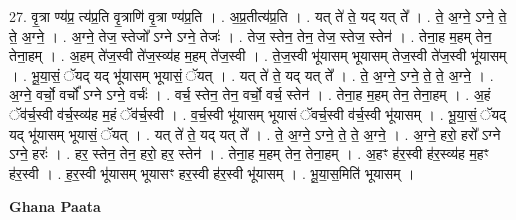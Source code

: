\documentclass[17pt]{extarticle}
\begin{document}
27. वृ॒त्रा ण्य॑प्र॒ त्य॑प्र॒ति वृ॒त्राणि॑ वृ॒त्रा ण्य॑प्र॒ति । . अ॒प्र॒तीत्य॑प्र॒ति । . यत् ते॑ ते॒ यद् यत् ते᳚ । . ते॒ अ॒ग्ने॒ ऽग्ने॒ ते॒ ते॒ अ॒ग्ने॒ । . अ॒ग्ने॒ तेज॒ स्तेजो᳚ ऽग्ने ऽग्ने॒ तेजः॑ । . तेज॒ स्तेन॒ तेन॒ तेज॒ स्तेज॒ स्तेन॑ । . तेना॒ह म॒हम् तेन॒ तेना॒हम् । . अ॒हम् ते॑ज॒स्वी ते॑ज॒स्व्य॑ह म॒हम् ते॑ज॒स्वी । . ते॒ज॒स्वी भू॑यासम् भूयासम् तेज॒स्वी ते॑ज॒स्वी भू॑यासम् । . भू॒या॒सं॒ ॅयद् यद् भू॑यासम् भूयासं॒ ॅयत् । . यत् ते॑ ते॒ यद् यत् ते᳚ । . ते॒ अ॒ग्ने॒ ऽग्ने॒ ते॒ ते॒ अ॒ग्ने॒ । . अ॒ग्ने॒ वर्चो॒ वर्चो᳚ ऽग्ने ऽग्ने॒ वर्चः॑ । . वर्च॒ स्तेन॒ तेन॒ वर्चो॒ वर्च॒ स्तेन॑ । . तेना॒ह म॒हम् तेन॒ तेना॒हम् । . अ॒हं ॅव॑र्च॒स्वी व॑र्च॒स्व्य॑ह म॒हं ॅव॑र्च॒स्वी । . व॒र्च॒स्वी भू॑यासम् भूयासं ॅवर्च॒स्वी व॑र्च॒स्वी भू॑यासम् । . भू॒या॒सं॒ ॅयद् यद् भू॑यासम् भूयासं॒ ॅयत् । . यत् ते॑ ते॒ यद् यत् ते᳚ । . ते॒ अ॒ग्ने॒ ऽग्ने॒ ते॒ ते॒ अ॒ग्ने॒ । . अ॒ग्ने॒ हरो॒ हरो᳚ ऽग्ने ऽग्ने॒ हरः॑ । . हर॒ स्तेन॒ तेन॒ हरो॒ हर॒ स्तेन॑ । . तेना॒ह म॒हम् तेन॒ तेना॒हम् । . अ॒हꣳ ह॑र॒स्वी ह॑र॒स्व्य॑ह म॒हꣳ ह॑र॒स्वी । . ह॒र॒स्वी भू॑यासम् भूयासꣳ हर॒स्वी ह॑र॒स्वी भू॑यासम् । . भू॒या॒स॒मिति॑ भूयासम् । \newline

\textbf{Ghana Paata } \newline
\end{document}
